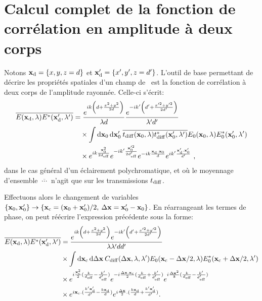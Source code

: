 \section{Calcul complet de la fonction de corrélation en amplitude à deux corps}
Notons $\mathbf{x}_{\mathrm{d}}=\lbrace x,y,z=d\rbrace$ et $\mathbf{x}_{\mathrm{d}}'=\lbrace x',y',z=d'\rbrace$. L'outil de base permettant de décrire les propriétés spatiales d'un champ de \speckle\ est la fonction de corrélation à deux corps de l'amplitude rayonnée. Celle-ci s'écrit:
\begin{align}
\overline{E(\mathbf{x}_{\mathrm{d}},\lambda)E^*(\mathbf{x}_{\mathrm{d}}',\lambda')} &= \frac{e^{ik \left( d+\frac{x^2+y^2}{2d} \right)}}{\lambda d} \frac{e^{-i k' \left( d'+ \frac{x'^2+y'^2}{2d'} \right)}}{\lambda' d'} \\
\nonumber & \quad \times \int{\mathop{}\mathopen{}\mathrm{d}\mathbf{x}_0\mathop{}\mathopen{}\mathrm{d}\mathbf{x}_0' \: \overline{t_{\mathrm{diff}}(\mathbf{x}_0, \lambda)t_{\mathrm{diff}}^*(\mathbf{x}_0', \lambda')} E_0(\mathbf{x}_0,\lambda) E_0^*(\mathbf{x}_0',\lambda')} \\
&\nonumber \quad \times e^{ik\frac{ \mathbf{x}_0^2}{2d_{\mathrm{eff}}}} e^{-ik'\frac{ \mathbf{x}_0'^2}{2d_{\mathrm{eff}}'}} e^{-ik \frac{\mathbf{x}_{\mathrm{d}} . \mathbf{x}_0}{d}} e^{ik' \frac{\mathbf{x}_{\mathrm{d}}' . \mathbf{x}_0'}{d'}} \text{ ,}
\end{align}
dans le cas général d'un éclairement polychromatique, et où le moyennage d'ensemble $\overline{\:\cdots\:}$ n'agit que sur les transmissions $t_{\mathrm{diff}}$.

Effectuons alors le changement de variables $\lbrace \mathbf{x}_0,\mathbf{x}_0' \rbrace\rightarrow \lbrace \mathbf{x}_{\mathrm{c}}=(\mathbf{x}_0+\mathbf{x}_0')/2 ,\: \Delta\mathbf{x}=\mathbf{x}_0'-\mathbf{x}_0 \rbrace$. En réarrangeant les termes de phase, on peut réécrire l'expression précédente sous la forme:
\begin{align}
\overline{E(\mathbf{x}_{\mathrm{d}},\lambda)E^*(\mathbf{x}_{\mathrm{d}}',\lambda')} &= \frac{e^{ik\left( d + \frac{x^2+y^2}{2d} \right)} e^{-ik' \left( d' + \frac{x'^2+y'^2}{2d'}\right)}}{\lambda \lambda' d d'} \\
\nonumber & \times \int{\mathop{}\mathopen{}\mathrm{d}\mathbf{x}_{\mathrm{c}}\mathop{}\mathopen{}\mathrm{d}\Delta\mathbf{x}\: C_{\mathrm{diff}}(\Delta\mathbf{x},\lambda,\lambda') E_0(\mathbf{x}_{\mathrm{c}}-\Delta\mathbf{x}/2,\lambda)E_0^*(\mathbf{x}_{\mathrm{c}}+\Delta\mathbf{x}/2,\lambda')} \\
& \nonumber \times e^{i\frac{\mathbf{x}_{\mathrm{c}}^2}{2} (\frac{k}{d_{\mathrm{eff}}} - \frac{k'}{d_{\mathrm{eff}}'})} e^{-i \frac{\Delta\mathbf{x} . \mathbf{x}_{\mathrm{c}}}{2} ( \frac{k}{d_{\mathrm{eff}}} + \frac{k'}{d_{\mathrm{eff}}'})} e^{i \frac{\Delta\mathbf{x}^2}{8}(\frac{k}{d_{\mathrm{eff}}} - \frac{k'}{d_{\mathrm{eff}}'})} \\
&\nonumber \times  e^{i\mathbf{x}_{\mathrm{c}}.(\frac{k' \mathbf{x}_{\mathrm{d}}'}{d'} - \frac{k \mathbf{x}_{\mathrm{d}}}{d})} e^{i\frac{\Delta\mathbf{x}}{2} . (\frac{k \mathbf{x}_{\mathrm{d}}}{d} + \frac{k' \mathbf{x}_{\mathrm{d}}'}{d'})} \text{.}
\end{align}

